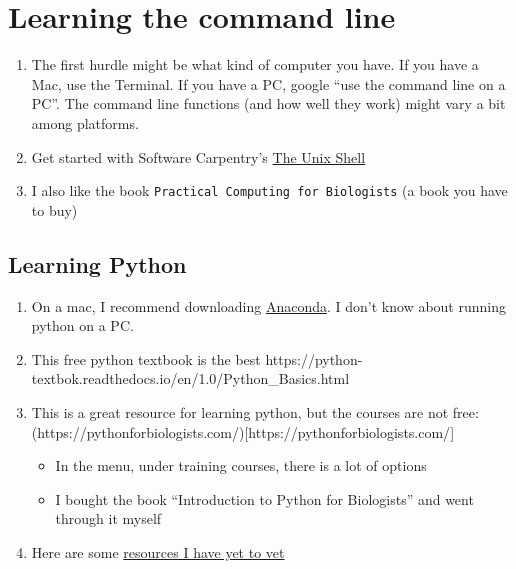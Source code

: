 \documentclass[
  letterpaper,
  DIV=11,
  numbers=noendperiod]{scrreprt}
\begin{document}
\hypertarget{learning-the-command-line}{%
\chapter*{\texorpdfstring{\textbf{Learning the command
line}}{Learning the command line}}\label{learning-the-command-line}}

\begin{enumerate}
\def\labelenumi{\arabic{enumi}.}
\item
  The first hurdle might be what kind of computer you have. If you have
  a Mac, use the Terminal. If you have a PC, google ``use the command
  line on a PC''. The command line functions (and how well they work)
  might vary a bit among platforms.
\item
  Get started with Software Carpentry's
  \href{https://swcarpentry.github.io/shell-novice/}{The Unix Shell}
\item
  I also like the book \texttt{Practical\ Computing\ for\ Biologists} (a
  book you have to buy)
\end{enumerate}

\hypertarget{learning-python}{%
\section*{\texorpdfstring{\textbf{Learning
Python}}{Learning Python}}\label{learning-python}}

\begin{enumerate}
\def\labelenumi{\arabic{enumi}.}
\item
  On a mac, I recommend downloading
  \href{https://www.anaconda.com/}{Anaconda}. I don't know about running
  python on a PC.
\item
  This free python textbook is the best
  https://python-textbok.readthedocs.io/en/1.0/Python\_Basics.html
\item
  This is a great resource for learning python, but the courses are not
  free:
  (https://pythonforbiologists.com/){[}https://pythonforbiologists.com/{]}

  \begin{itemize}
  \item
    In the menu, under training courses, there is a lot of options
  \item
    I bought the book ``Introduction to Python for Biologists'' and went
    through it myself
  \end{itemize}
\item
  Here are some
  \href{https://wiki.python.org/moin/BeginnersGuide/Programmers}{resources
  I have yet to vet}
\end{enumerate}
\end{document}
